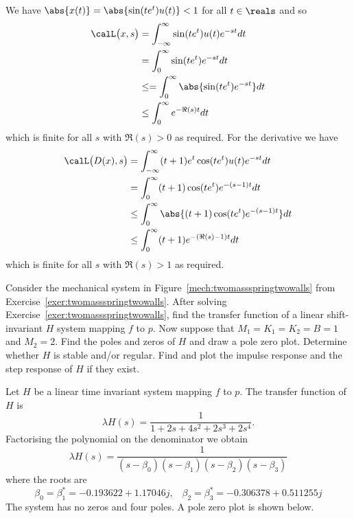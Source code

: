 \begin{excersizelist}
\begin{solution}
We have $\abs{x(t)} = \abs{\sin(t e^t) u(t)} < 1$ for all $t \in \reals$ and so
\begin{align*}
\calL\big( x , s\big) &= \int_{-\infty}^\infty \sin(t e^t) u(t) e^{-s t} dt \\
&= \int_{0}^\infty \sin(t e^t) e^{-s t}  dt \\
&\leq = \int_{0}^\infty \abs{\sin(t e^t) e^{-s t}}  dt \\
&\leq \int_{0}^\infty e^{-\Re(s) t}  dt
\end{align*}
which is finite for all $s$ with $\Re(s) > 0$ as required.  For the derivative we have
\begin{align*}
\calL\big( D(x) , s\big) &= \int_{-\infty}^\infty (t+1)e^t \cos(t e^t) u(t) e^{-s t} dt \\
&= \int_{0}^\infty (t+1) \cos(t e^t) e^{-(s-1) t}  dt \\
&\leq \int_{0}^\infty \abs{(t+1) \cos(t e^t) e^{-(s-1) t}}  dt \\
&\leq \int_{0}^\infty (t+1) e^{-(\Re(s)-1) t}  dt
\end{align*}
which is finite for all $s$ with $\Re(s) > 1$ as required.
\end{solution}

\item \label{exer:twomassspringtwowallstranfuncpolezeros} Consider the mechanical system in Figure~\ref{mech:twomassspringtwowalls} from Exercise~\ref{exer:twomassspringtwowalls}.  After solving Exercise~\ref{exer:twomassspringtwowalls}, find the transfer function of a linear shift-invariant $H$ system mapping $f$ to $p$.  Now suppose that $M_1 = K_1 = K_2 = B = 1$ and $M_2 = 2$.  Find the poles and zeros of $H$ and draw a pole zero plot.  Determine whether $H$ is stable and/or regular.  Find and plot the impulse response and the step response of $H$ if they exist.

\begin{solution}
Let $H$ be a linear time invariant system mapping $f$ to $p$.  The transfer function of $H$ is
\[
\lambda H(s) = \frac{1}{1 + 2s + 4s^2 + 2s^3 + 2s^4}.
\]
Factorising the polynomial on the denominator we obtain
\[
\lambda H(s) = \frac{1}{(s-\beta_0)(s-\beta_1)(s-\beta_2)(s-\beta_3)}
\]
where the roots are
\[
\beta_0 = \beta_1^* = -0.193622 + 1.17046j, \;\;\; \beta_2 = \beta_3^* = -0.306378 + 0.511255j
\]
The system has no zeros and four poles.  A pole zero plot is shown below.  


\end{solution}
\end{excersizelist}

